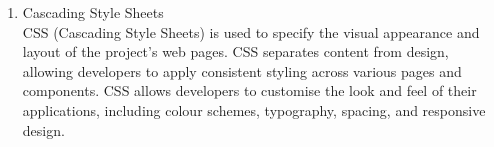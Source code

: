 \documentclass[a4paper,12pt]{article}  %
\begin{document}
\begin{enumerate}
      \item Cascading Style Sheets\\
      CSS (Cascading Style Sheets) is used to specify the visual appearance and layout of the project's web pages. CSS separates content from design, allowing developers to apply consistent styling across various pages and components. CSS allows developers to customise the look and feel of their applications, including colour schemes, typography, spacing, and responsive design\cite{w3schools2024css}.\\
\end{enumerate}



\end{document}

